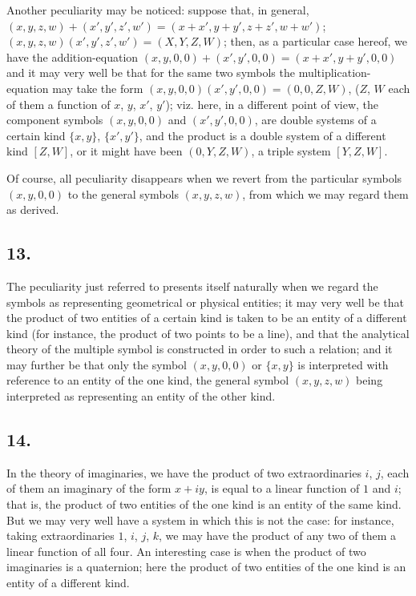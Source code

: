 \documentclass[11pt,a4paper]{book}
\begin{document}
Another peculiarity may be noticed: suppose that, in general, $(x, y, z, w) + (x', y', z', w') = (x + x', y + y', z + z', w + w')$; $(x, y, z, w)(x', y', z', w') = (X, Y, Z, W)$; then, as a particular case hereof, we have the addition-equation $(x, y, 0, 0) + (x', y', 0, 0) = (x + x', y + y', 0, 0)$ and it may very well be that for the same two symbols the multiplication-equation may take the form $(x, y, 0, 0)(x', y', 0, 0) = (0, 0, Z, W)$, ($Z$, $W$ each of them a function of $x$, $y$, $x'$, $y'$); viz. here, in a different point of view, the component symbols $(x, y, 0, 0)$ and $(x', y', 0, 0)$, are double systems of a certain kind $\{x, y\}$, $\{x', y'\}$, and the product is a double system of a different kind $[Z, W]$, or it might have been $(0, Y, Z, W)$, a triple system $[Y, Z, W]$.

Of course, all peculiarity disappears when we revert from the particular symbols $(x, y, 0, 0)$ to the general symbols $(x, y, z, w)$, from which we may regard them as derived.

\subsection*{13.}

The peculiarity just referred to presents itself naturally when we regard the symbols as representing geometrical or physical entities; it may very well be that the product of two entities of a certain kind is taken to be an entity of a different kind (for instance, the product of two points to be a line), and that the analytical theory of the multiple symbol is constructed in order to such a relation; and it may further be that only the symbol $(x, y, 0, 0)$ or $\{x, y\}$ is interpreted with reference to an entity of the one kind, the general symbol $(x, y, z, w)$ being interpreted as representing an entity of the other kind.

\subsection*{14.}

In the theory of imaginaries, we have the product of two extraordinaries $i$, $j$, each of them an imaginary of the form $x + iy$, is equal to a linear function of $1$ and $i$; that is, the product of two entities of the one kind is an entity of the same kind. But we may very well have a system in which this is not the case: for instance, taking extraordinaries $1$, $i$, $j$, $k$, we may have the product of any two of them a linear function of all four. An interesting case is when the product of two imaginaries is a quaternion; here the product of two entities of the one kind is an entity of a different kind.
\end{document}
